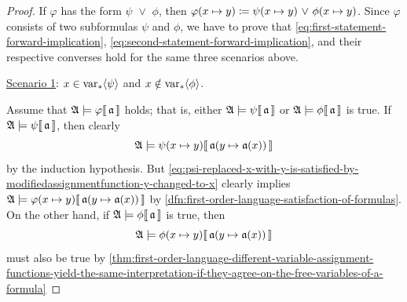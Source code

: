 \begin{proof}
    \vspace{0.3cm}
    \noindent
    If \( \varphi \) has the form \( \psi \,\,{\lor}\,\, \phi \), then \( \folfreevariablereplacement{\varphi}{x}{y} \coloneq \folfreevariablereplacement{\psi}{x}{y} \,\,{\lor}\,\, \folfreevariablereplacement{\phi}{x}{y} \).
    Since \( \varphi \) consists of two subformulas \( \psi \) and \( \phi \), we have to prove that \eqref{eq:first-statement-forward-implication}, \eqref{eq:second-statement-forward-implication}, and their respective converses hold for the same three scenarios above.

    \vspace{0.3cm}
    \noindent
    \underline{Scenario 1}: \( x \in \operatorname{var}_{\ast} \langle\psi\rangle \) and \( x \notin \operatorname{var}_{\ast} \langle\phi\rangle \).

    \vspace{0.1cm}
    \noindent
    Assume that \(  \mathfrak{A} \models \varphi\llbracket\, \mathfrak{a} \,\rrbracket \) holds; that is, either
    \(  \mathfrak{A} \models \psi\llbracket\, \mathfrak{a} \,\rrbracket \) or \(  \mathfrak{A} \models \phi\llbracket\, \mathfrak{a} \,\rrbracket \) is true.
    If \(  \mathfrak{A} \models \psi\llbracket\, \mathfrak{a} \,\rrbracket \), then clearly
    \begin{equation}
        \label{eq:psi-replaced-x-with-y-is-satisfied-by-modifiedassignmentfunction-y-changed-to-x}
        \folwffsatisfaction{\mathfrak{A}}{ \folfreevariablereplacement{\psi}{x}{y} }{ \folmodifiedvariableassignmentfunction{\mathfrak{a}}{y}{\mathfrak{a}(x)} }
    \end{equation}
    by the induction hypothesis. But \eqref{eq:psi-replaced-x-with-y-is-satisfied-by-modifiedassignmentfunction-y-changed-to-x}
    clearly implies
    \( \folwffsatisfaction{\mathfrak{A}}{ \folfreevariablereplacement{\varphi}{x}{y} }{ \folmodifiedvariableassignmentfunction{\mathfrak{a}}{y}{\mathfrak{a}(x)} } \)
    by \cref{dfn:first-order-language-satisfaction-of-formulas}. On the other hand, if \(  \mathfrak{A} \models \phi\llbracket\, \mathfrak{a} \,\rrbracket \) is true,
    then
    \begin{equation}
        \label{eq:phi-replaced-x-with-y-is-satisfied-by-modifiedassignmentfunction-y-changed-to-x}
        \folwffsatisfaction{\mathfrak{A}}{ \folfreevariablereplacement{\phi}{x}{y} }{ \folmodifiedvariableassignmentfunction{\mathfrak{a}}{y}{\mathfrak{a}(x)} }
    \end{equation}
    must also be true by \cref{thm:first-order-language-different-variable-assignment-functions-yield-the-same-interpretation-if-they-agree-on-the-free-variables-of-a-formula}

\end{proof}
